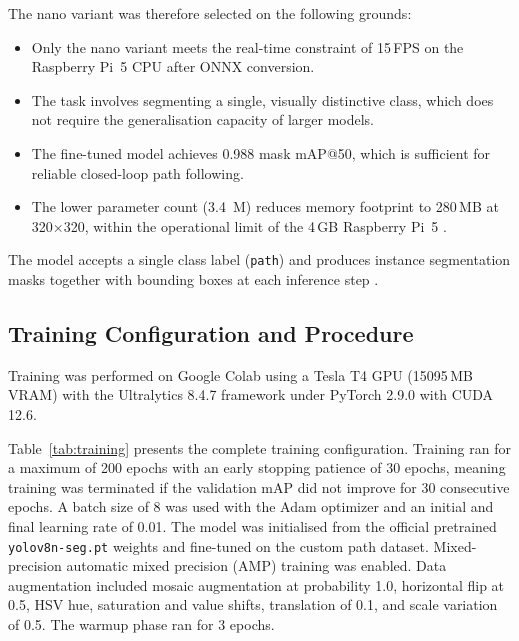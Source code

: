 The nano variant was therefore selected on the following grounds:

\begin{itemize}
  \item Only the nano variant meets the real-time constraint of
        15\,FPS on the Raspberry Pi~5 CPU after ONNX conversion.
  \item The task involves segmenting a single, visually distinctive
        class, which does not require the generalisation capacity
        of larger models.
  \item The fine-tuned model achieves 0.988 mask mAP@50, which is
        sufficient for reliable closed-loop path following.
  \item The lower parameter count (3.4~M) reduces memory footprint
        to 280\,MB at 320$\times$320, within the operational limit
        of the 4\,GB Raspberry Pi~5 \cite{r34}.
\end{itemize}

The model accepts a single class label (\texttt{path}) and produces
instance segmentation masks together with bounding boxes at each
inference step \cite{r12,r13,r29}.

\subsection{Training Configuration and Procedure}

Training was performed on Google Colab using a Tesla T4 GPU (15095\,MB
VRAM) with the Ultralytics 8.4.7 framework \cite{r32} under PyTorch
2.9.0 with CUDA 12.6.

Table~\ref{tab:training} presents the complete training configuration.
Training ran for a maximum of 200 epochs with an early stopping patience
of 30 epochs, meaning training was terminated if the validation mAP did
not improve for 30 consecutive epochs. A batch size of 8 was used with
the Adam optimizer and an initial and final learning rate of 0.01. The
model was initialised from the official pretrained \texttt{yolov8n-seg.pt}
weights and fine-tuned on the custom path dataset. Mixed-precision
automatic mixed precision (AMP) training was enabled. Data augmentation
included mosaic augmentation at probability 1.0, horizontal flip at
0.5, HSV hue, saturation and value shifts, translation of 0.1, and
scale variation of 0.5. The warmup phase ran for 3 epochs.

